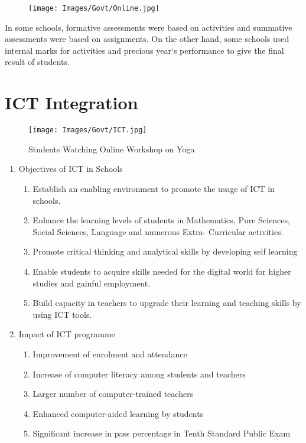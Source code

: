 \begin{figure}[H]
    \centering
    \texttt{[image: Images/Govt/Online.jpg]}
\end{figure}

In some schools, formative assessments were based on activities and summative assessments were based on assignments. On the other hand, some schools used internal marks for activities and precious year`s performance to give the final result of students. 

\section{ICT Integration}
\begin{figure}[H]
    \centering
    \texttt{[image: Images/Govt/ICT.jpg]}
    \caption*{Students Watching Online Workshop on Yoga}
\end{figure}

\begin{enumerate}
\item Objectives of ICT in Schools
\begin{enumerate}
    \item  Establish an enabling environment to promote the usage of ICT in
schools.
\item Enhance the learning levels of students in Mathematics, Pure Sciences,
Social Sciences, Language and numerous Extra- Curricular activities.
\item Promote critical thinking and analytical skills by developing self learning
\item Enable students to acquire skills needed for the digital world for higher studies and gainful employment.
\item Build capacity in teachers to upgrade their learning and teaching skills by
using ICT tools.
\end{enumerate}
\item Impact of ICT programme
\begin{enumerate}
\item  Improvement of enrolment and attendance
\item Increase of computer literacy among students and teachers
\item Larger number of computer-trained teachers
\item Enhanced computer-aided learning by students
\item Significant increase in pass percentage in Tenth Standard Public Exam
\end{enumerate}
\end{enumerate}
